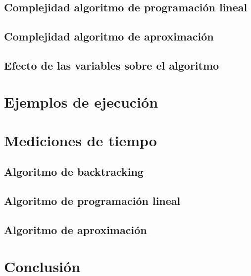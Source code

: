 \documentclass{article}
\begin{document}
\subsection{Complejidad algoritmo de programación lineal}
\subsection{Complejidad algoritmo de aproximación}

\subsection{Efecto de las variables sobre el algoritmo}

\section{Ejemplos de ejecución}
\label{sec:ejemplos}
\section{Mediciones de tiempo}
\label{sec:medTiempo}
\subsection{Algoritmo de backtracking}
\subsection{Algoritmo de programación lineal}
\subsection{Algoritmo de aproximación}


\section{Conclusión}
\end{document}
